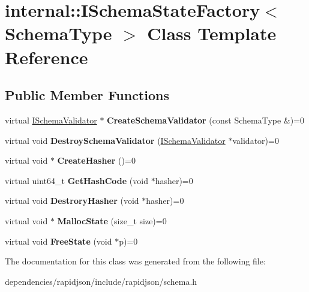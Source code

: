 \hypertarget{classinternal_1_1_i_schema_state_factory}{}\section{internal\+:\+:I\+Schema\+State\+Factory$<$ Schema\+Type $>$ Class Template Reference}
\label{classinternal_1_1_i_schema_state_factory}
\subsection*{Public Member Functions}
\begin{DoxyCompactItemize}
\item 
\mbox{\label{classinternal_1_1_i_schema_state_factory_ae8c98fcff6a057b4fcd9018fc14551a8}} 
virtual \hyperlink{classinternal_1_1_i_schema_validator}{I\+Schema\+Validator} $\ast$ {\bfseries Create\+Schema\+Validator} (const Schema\+Type \&)=0
\item 
\mbox{\label{classinternal_1_1_i_schema_state_factory_a112cbf154077050bc30ffe670032442c}} 
virtual void {\bfseries Destroy\+Schema\+Validator} (\hyperlink{classinternal_1_1_i_schema_validator}{I\+Schema\+Validator} $\ast$validator)=0
\item 
\mbox{\label{classinternal_1_1_i_schema_state_factory_a4ac37b9d3e9526004c82692473f978f4}} 
virtual void $\ast$ {\bfseries Create\+Hasher} ()=0
\item 
\mbox{\label{classinternal_1_1_i_schema_state_factory_addfcf00963cc777edf642b204f07c8d6}} 
virtual uint64\+\_\+t {\bfseries Get\+Hash\+Code} (void $\ast$hasher)=0
\item 
\mbox{\label{classinternal_1_1_i_schema_state_factory_a70b8d88180d2e6993105b17f19101635}} 
virtual void {\bfseries Destrory\+Hasher} (void $\ast$hasher)=0
\item 
\mbox{\label{classinternal_1_1_i_schema_state_factory_ada92ebf8e9ef994f7e20a0f7f9750519}} 
virtual void $\ast$ {\bfseries Malloc\+State} (size\+\_\+t size)=0
\item 
\mbox{\label{classinternal_1_1_i_schema_state_factory_a27bd2138940cac3c330dd8399c49b22b}} 
virtual void {\bfseries Free\+State} (void $\ast$p)=0
\end{DoxyCompactItemize}


The documentation for this class was generated from the following file\+:\begin{DoxyCompactItemize}
\item 
dependencies/rapidjson/include/rapidjson/schema.\+h\end{DoxyCompactItemize}
